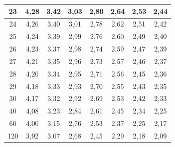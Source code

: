 \documentclass[
]{book}
\begin{document}
\begin{table}
\begin{tabular}[t]{c|c|c|c|c|c|c|c}
23 & 4,28 & 3,42 & 3,03 & 2,80 & 2,64 & 2,53 & 2,44\\
\hline
24 & 4,26 & 3,40 & 3,01 & 2,78 & 2,62 & 2,51 & 2,42\\
\hline
25 & 4,24 & 3,39 & 2,99 & 2,76 & 2,60 & 2,49 & 2,40\\
\hline
26 & 4,23 & 3,37 & 2,98 & 2,74 & 2,59 & 2,47 & 2,39\\
\hline
27 & 4,21 & 3,35 & 2,96 & 2,73 & 2,57 & 2,46 & 2,37\\
\hline
28 & 4,20 & 3,34 & 2,95 & 2,71 & 2,56 & 2,45 & 2,36\\
\hline
29 & 4,18 & 3,33 & 2,93 & 2,70 & 2,55 & 2,43 & 2,35\\
\hline
30 & 4,17 & 3,32 & 2,92 & 2,69 & 2,53 & 2,42 & 2,33\\
\hline
40 & 4,08 & 3,23 & 2,84 & 2,61 & 2,45 & 2,34 & 2,25\\
\hline
60 & 4,00 & 3,15 & 2,76 & 2,53 & 2,37 & 2,25 & 2,17\\
\hline
120 & 3,92 & 3,07 & 2,68 & 2,45 & 2,29 & 2,18 & 2,09\\
\hline
\end{tabular}
\end{table}

\addtocounter{table}{-1}
\end{document}
